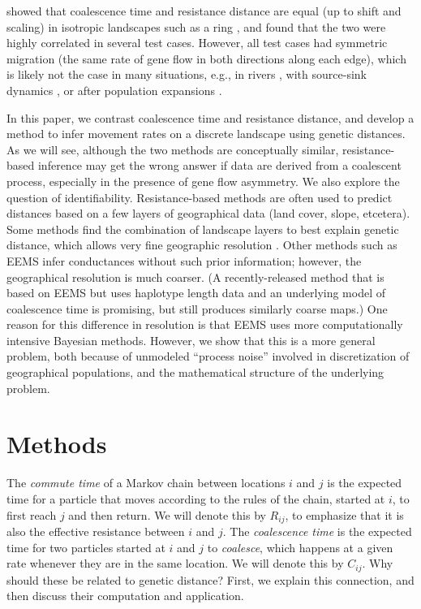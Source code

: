 \documentclass{article}
\begin{document}
\citet{mcrae2006isolation} showed that coalescence time and resistance distance are equal
(up to shift and scaling) in isotropic landscapes such as a ring \citep{matsen2006convergence},
and found that the two were highly correlated in several test cases.
However, all test cases had symmetric migration
(the same rate of gene flow in both directions along each edge),
which is likely not the case in many situations, e.g.,
in rivers \citep{morrissey2009maintenance,sundqvist2016directional,hanks2017modeling},
with source-sink dynamics \citep{dias1996sources},
or after population expansions \citep{with2002landscape}.

In this paper, we contrast 
coalescence time and resistance distance,
and develop a method to infer movement rates on a discrete landscape
using genetic distances.
As we will see,
although the two methods are conceptually similar,
resistance-based inference may get the wrong answer if data are derived from a coalescent process,
especially in the presence of gene flow asymmetry.
We also explore the question of identifiability.
Resistance-based methods are often used to predict distances based on a few layers of geographical data
(land cover, slope, etcetera).
Some methods find the combination of landscape layers to best explain genetic distance,
which allows very fine geographic resolution \citep{shaffer2017desert}.
Other methods such as EEMS \citep{petkova2016visualizing} infer conductances without such prior information;
however, the geographical resolution is much coarser.
(A recently-released method 
that is based on EEMS but uses haplotype length data and an underlying model of coalescence time
\citep{alasadi2018estimating}
is promising, but still produces similarly coarse maps.)
One reason for this difference in resolution
is that EEMS uses more computationally intensive Bayesian methods.
However, we show that this is a more general problem,
both because of unmodeled ``process noise'' involved in discretization of geographical populations,
and the mathematical structure of the underlying problem.


\section*{Methods}


The \emph{commute time} of a Markov chain between locations $i$ and $j$
is the expected time for a particle that moves according to the rules of the chain, 
started at $i$, to first reach $j$ and then return.
We will denote this by $R_{ij}$, to emphasize that it is also the effective resistance
between $i$ and $j$.
The \emph{coalescence time} is the expected time for two particles started at $i$ and $j$
to \emph{coalesce},
which happens at a given rate whenever they are in the same location.
We will denote this by $C_{ij}$.
Why should these be related to genetic distance? 
First, we explain this connection,
and then discuss their computation and application.
\end{document}
